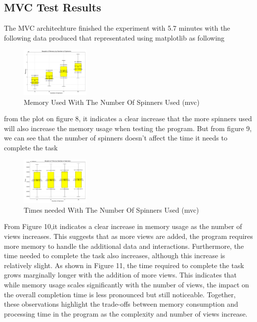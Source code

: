 \documentclass[conference]{IEEEtran}
\begin{document}
\subsection{MVC Test Results}
The MVC architechture finished the experiment with 5.7 minutes with the following data produced that representated using matplotlib as following


\begin{figure}
    [h]
    \centering
    \includegraphics[width = 0.3\textwidth]{Image/mvc_plot_spin_total_memory.pdf}
    \caption{Memory Used With The Number Of Spinners Used (mvc)}
    \label{fig:enter-label}
\end{figure}

from the plot on figure 8, it indicates a clear increase that the more spinners used will also increase the memory usage when testing the program. But from figure 9, we can see that the number of spinners doesn't affect the time it needs to complete the task
\begin{figure}
    [h]
    \centering
    \includegraphics[width = 0.3\textwidth]{Image/mvc_plot_spin_total_time.pdf}
    \caption{Times needed With The Number Of Spinners Used (mvc)}
    \label{fig:enter-label}
\end{figure}

From Figure 10,it indicates a clear increase in memory usage as the number of views increases. This suggests that as more views are added, the program requires more memory to handle the additional data and interactions. Furthermore, the time needed to complete the task also increases, although this increase is relatively slight. As shown in Figure 11, the time required to complete the task grows marginally longer with the addition of more views. This indicates that while memory usage scales significantly with the number of views, the impact on the overall completion time is less pronounced but still noticeable. Together, these observations highlight the trade-offs between memory consumption and processing time in the program as the complexity and number of views increase.
\end{document}
